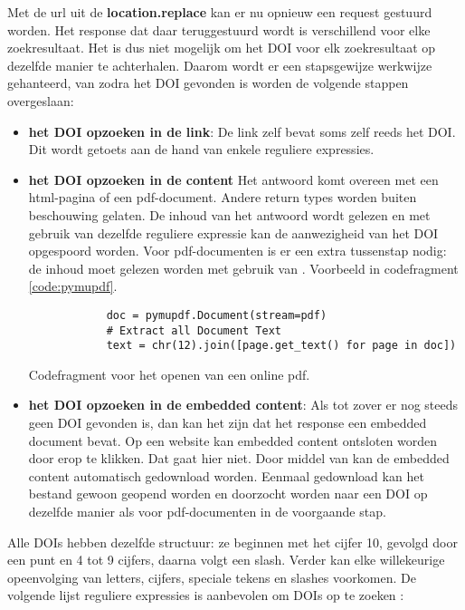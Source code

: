 Met de url uit de \textbf{location.replace} kan er nu opnieuw een request gestuurd worden.
Het response dat daar teruggestuurd wordt is verschillend voor elke zoekresultaat. Het is dus niet mogelijk om het DOI voor elk zoekresultaat op dezelfde manier te achterhalen. Daarom wordt er een stapsgewijze werkwijze gehanteerd, van zodra het DOI gevonden is worden de volgende stappen overgeslaan:
\begin{itemize}
    \item \textbf{het DOI opzoeken in de link}: De link zelf bevat soms zelf reeds het DOI. Dit wordt getoets aan de hand van enkele reguliere expressies.
    \item \textbf{het DOI opzoeken in de content} Het antwoord komt overeen met een html-pagina of een pdf-document. Andere return types worden buiten beschouwing gelaten. De inhoud van het antwoord wordt gelezen en met gebruik van dezelfde reguliere expressie kan de aanwezigheid van het DOI opgespoord worden. Voor pdf-documenten is er een extra tussenstap nodig: de inhoud moet gelezen worden met gebruik van \autocite{Pymupdf2025}. Voorbeeld in codefragment \ref{code:pymupdf}.
    \begin{listing}
        \begin{verbatim}
            doc = pymupdf.Document(stream=pdf)
            # Extract all Document Text
            text = chr(12).join([page.get_text() for page in doc])
        \end{verbatim}
    \caption[Pymupdf codefragment]{Codefragment voor het openen van een online pdf.}
    \label{code:pymupdf}
\end{listing}
    \item \textbf{het DOI opzoeken in de embedded content}: Als tot zover er nog steeds geen DOI gevonden is, dan kan het zijn dat het response een embedded document bevat. Op een website kan embedded content ontsloten worden door erop te klikken. Dat gaat hier niet.  Door middel van \autocite{Selenium2025} kan de embedded content automatisch gedownload worden. Eenmaal gedownload kan het bestand gewoon geopend worden en doorzocht worden naar een DOI op dezelfde manier als voor pdf-documenten in de voorgaande stap.    
\end{itemize}
Alle DOIs hebben dezelfde structuur: ze beginnen met het cijfer 10, gevolgd door een punt en 4 tot 9 cijfers, daarna volgt een slash. Verder kan elke willekeurige opeenvolging van letters, cijfers, speciale tekens en slashes voorkomen.
De volgende lijst reguliere expressies is aanbevolen om DOIs op te zoeken \textcite{CrossrefRegex2025}:

